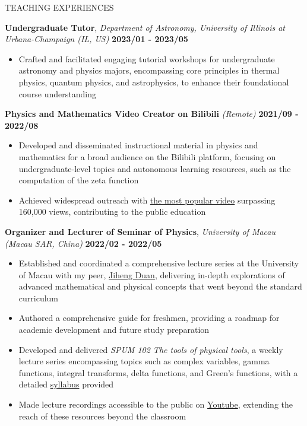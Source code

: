 \documentclass[10pt]{article} %
\begin{document}
\begin{section}{TEACHING EXPERIENCES}

\textbf{Undergraduate Tutor}, \textit{Department of Astronomy, University of Illinois at Urbana-Champaign (IL, US)} \hfill \textbf{2023/01 - 2023/05}
\begin{itemize}[leftmargin=1.5em]
    \item Crafted and facilitated engaging tutorial workshops for undergraduate astronomy and physics majors, encompassing core principles in thermal physics, quantum physics, and astrophysics, to enhance their foundational course understanding
\end{itemize}

\textbf{Physics and Mathematics Video Creator on Bilibili} \textit{(Remote)} \hfill \textbf{2021/09 - 2022/08}
\begin{itemize}[leftmargin=1.5em]
    \item Developed and disseminated instructional material in physics and mathematics for a broad audience on the Bilibili platform, focusing on undergraduate-level topics and autonomous learning resources, such as the computation of the zeta function
    \item Achieved widespread outreach with \href{https://www.bilibili.com/video/BV1th411W7xu/}{the most popular video} surpassing 160,000 views, contributing to the public education
\end{itemize}

\textbf{Organizer and Lecturer of Seminar of Physics}, \textit{University of Macau (Macau SAR, China)} \hfill \textbf{2022/02 - 2022/05}
\begin{itemize}[leftmargin=1.5em]
    \item Established and coordinated a comprehensive lecture series at the University of Macau with my peer, \href{http://runawayfancy.me/}{Jiheng Duan}, delivering in-depth explorations of advanced mathematical and physical concepts that went beyond the standard curriculum
    \item Authored a comprehensive guide for freshmen, providing a roadmap for academic development and future study preparation
    \item Developed and delivered \textit{SPUM 102 The tools of physical tools}, a weekly lecture series encompassing topics such as complex variables, gamma functions, integral transforms, delta functions, and Green's functions, with a detailed \href{https://github.com/Chisen-Lupus/Seminar-of-Physics-UM/blob/main/SPUM%20102%20The%20tools%20of%20physical%20tool.pdf}{syllabus} provided
    \item Made lecture recordings accessible to the public on \href{https://www.youtube.com/watch?v=nQkv03r-XeQ&list=PLV9fHDZW7hHWQ9rrAk7c9kdeV-Lqyt7pV&index=10}{Youtube}, extending the reach of these resources beyond the classroom
\end{itemize}


\end{section}
\end{document}
